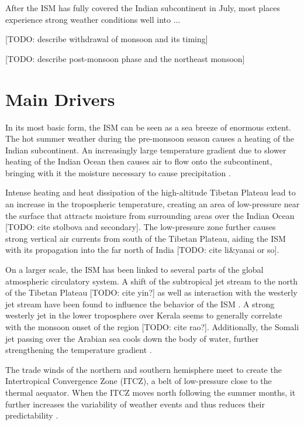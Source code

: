 After the ISM has fully covered the Indian subcontinent in July, most places experience strong weather conditions well into ...

[TODO: describe withdrawal of monsoon and its timing]

[TODO: describe post-monsoon phase and the northeast monsoon]

\section{Main Drivers}
\label{st:ism_factors}
In its most basic form, the ISM can be seen as a sea breeze of enormous extent. The hot summer weather during the pre-monsoon season causes a heating of the Indian subcontinent. An increasingly large temperature gradient due to slower heating of the Indian Ocean then causes air to flow onto the subcontinent, bringing with it the moisture necessary to cause precipitation \citep{Willetts.2017}.

Intense heating and heat dissipation of the high-altitude Tibetan Plateau lead to an increase in the tropospheric temperature, creating an area of low-pressure near the surface that attracts moisture from surrounding areas over the Indian Ocean [TODO: cite stolbova and secondary]. The low-pressure zone further causes strong vertical air currents from south of the Tibetan Plateau, aiding the ISM with its propagation into the far north of India \citep{Pradhan.2017} [TODO: cite li\&yanai or so].

On a larger scale, the ISM has been linked to several parts of the global atmospheric circulatory system. A shift of the subtropical jet stream to the north of the Tibetan Plateau [TODO: cite yin?] as well as interaction with the westerly jet stream have been found to influence the behavior of the ISM \citep{Ordonez.2016, Stolbova.2015}. A strong westerly jet in the lower troposphere over Kerala seems to generally correlate with the monsoon onset of the region \citep{Ordonez.2016} [TODO: cite rao?]. Additionally, the Somali jet passing over the Arabian sea cools down the body of water, further strengthening the temperature gradient \citep{Stolbova.2015}.

The trade winds of the northern and southern hemisphere meet to create the Intertropical Convergence Zone (ITCZ), a belt of low-pressure close to the thermal aequator. When the ITCZ moves north following the summer months, it further increases the variability of weather events and thus reduces their predictability \citep{Stolbova.2015}.


